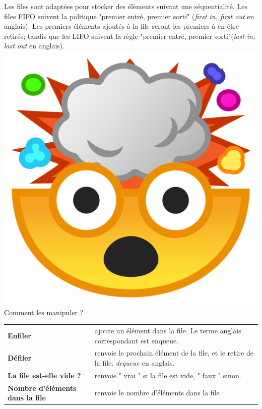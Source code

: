 \documentclass{report}
\begin{document}
Les files sont adaptées pour stocker des élèments suivant une séquentialité. Les files FIFO suivent la politique "premier entré, premier sorti" (\textit{first in, first out} en anglais). Les premiers éléments ajoutés à la file seront les premiers à en être retirés; tandis que les LIFO suivent la règle "premier entré, premier sorti"(\textit{last in, last out} en anglais).\\

\includegraphics[scale=0.03]{mindblow}{\selectfont
Comment les manipuler ?\\
}

\begin{tabular}{l|l}
     \textbf{Enfiler} & ajoute un élément dans la file. Le terme anglais correspondant est enqueue.\\
     \textbf{Défiler} & renvoie le prochain élément de la file, et le retire de la file. \textit{dequeue} en anglais.\\
     \textbf{La file est-elle vide ?} & renvoie  " vrai  " si la file est vide,  " faux  " sinon.\\
     \textbf{Nombre d'éléments dans la file} & renvoie le nombre d'éléments dans la file \\[0.5cm]
\end{tabular}
\end{document}
